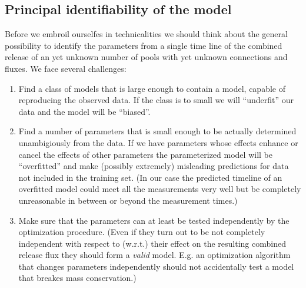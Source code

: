 \documentclass[a4paper]{article}\usepackage[]{graphicx}\usepackage[]{color}
\begin{document}
\subsection{Principal identifiability of the model}
Before we embroil ourselfes in technicalities we should think about the general possibility to identify the parameters from a single time line of the combined release of an yet unknown number of pools with yet unknown connections and fluxes.
We face several challenges:
\begin{enumerate}
\item 
	\label{accuracy} Find a class of models that is large enough to contain a model, capable of reproducing the observed data. If the class is to small we will ``underfit'' our data and the model will be ``biased''.
\item 
	\label{identifiability} Find a number of parameters that is small enough to be actually determined unambigiously from the data. If we have parameters whose effects enhance or cancel the effects of other parameters the parameterized model will be ``overfitted'' and make (possibly extremely) misleading predictions for data not included in the training set. (In our case the predicted timeline of an overfitted model could meet all the measurements very well but be completely unreasonable in between or beyond the measurement times.)
\item 
	\label{independence} Make sure that the parameters can at least be tested independently by the optimization procedure. (Even if they turn out to be not completely independent with respect to (w.r.t.) their effect on the resulting combined release flux they should form a \emph{valid} model. E.g. an optimization algorithm that changes parameters independently should not accidentally test a model that breakes mass conservation.)
\end{enumerate}
\end{document}
